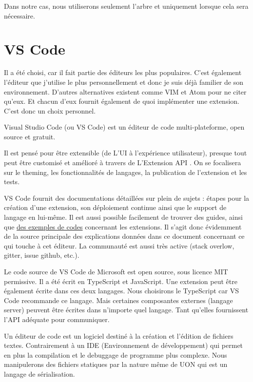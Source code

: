 \documentclass[
    iict, %
    il, %
]{heig-tb}
\begin{document}
Dans notre cas, nous utiliserons seulement l'arbre et uniquement lorsque cela sera nécessaire.

\section{VS Code}
Il a été choisi, car il fait partie des éditeurs les plus populaires. C'est également l'éditeur que j'utilise le plus personnellement et donc je suis déjà familier de son environnement.
D'autres alternatives existent comme VIM et Atom pour ne citer qu'eux. Et chacun d'eux fournit également de quoi implémenter une extension.
C'est donc un choix personnel.

Visual Studio Code (ou VS Code) est un éditeur de code multi-plateforme, open source et gratuit.

Il est pensé pour être extensible (de L'UI à l'expérience utilisateur), presque tout peut être customisé et amélioré à travers de L'Extension API \cite{extension-api}.
On se focalisera sur le theming, les fonctionnalités de langages, la publication de l'extension et les tests.

VS Code fournit des documentations détaillées sur plein de sujets : étapes pour la création d'une extension, son déploiement continue ainsi que le support de langage en lui-même.
Il est aussi possible facilement de trouver des guides, ainsi que \href{https://github.com/microsoft/vscode-extension-samples}{des exemples de codes} concernant les extensions.
Il s'agit donc évidemment de la source principale des explications données dans ce document concernant ce qui touche à cet éditeur.
La communauté est aussi très active (stack overlow, gitter, issue github, etc.).

Le code source de VS Code de Microsoft est open source, sous licence MIT permissive.
Il a été écrit en TypeScript et JavaScript. Une extension peut être également écrite dans ces deux langages.
Nous choisirons le TypeScript car VS Code recommande ce langage. Mais certaines composantes externes (langage server) peuvent être écrites dans n'importe quel langage. Tant qu'elles fournissent l'API adéquate pour communiquer.

Un éditeur de code est un logiciel destiné à la création et l'édition de fichiers textes.
Contrairement à un IDE (Environnement de développement) qui permet en plus la compilation et le debuggage de programme plus complexe.
Nous manipulerons des fichiers statiques par la nature même de UON qui est un langage de sérialisation.
\end{document}
